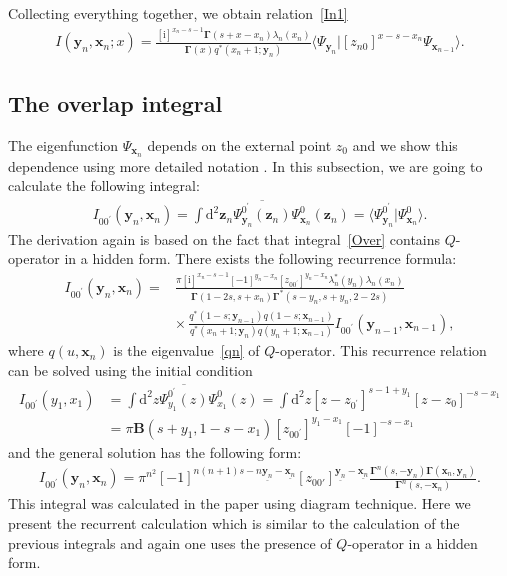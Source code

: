 \documentclass[10pt,a4paper]{amsart}
\renewcommand{\imath}{\mathrm{i}}
\numberwithin{equation}{section}
\begin{document}
Collecting everything together, we obtain relation~\eqref{In1}
\begin{align*}
I(\bm{y}_n,\bm{x}_{n};x) =
\frac{[\imath]^{x_n-s-1} \mathbf{\Gamma}(s+x-x_n) \lambda_n(x_n)}
{\mathbf{\Gamma}(x) q^*(x_n+1;\bm{y}_n)}
\langle \Psi_{\bm{y}_n}|
 [z_{n0}]^{x-s-x_n} \Psi_{\bm{x}_{n-1}}\rangle .
\end{align*}

\subsection{The overlap integral}

The eigenfunction $\Psi_{\bm{x}_{n}}$ depends on the external point
$z_0$ and we show this dependence using more detailed
notation .
In this subsection, we are going to calculate the following integral:
\begin{align}\label{Over}
I_{0 0^{\prime}}(\bm{y}_n,\bm{x}_{n}) =
\int \mathrm{d}^{2}\bm{z}_n
\overline{\Psi^{0^{\prime}}_{\bm{y}_n}(\bm{z}_n)}
\Psi^{0}_{\bm{x}_{n}}(\bm{z}_n) =
\bigl\langle\Psi^{0^{\prime}}_{\bm{y}_n} | \Psi^{0}_{\bm{x}_{n}}\bigr\rangle .
\end{align}
The derivation again is based on the fact that integral~\eqref{Over} contains $Q$-operator in a hidden form. There exists the following recurrence formula:
\begin{align}
\nonumber
I_{0 0^{\prime}}(\bm{y}_n,\bm{x}_{n}) ={}&
\frac{\pi [\imath]^{x_n-s-1} [-1]^{y_n-x_n} [z_{0 0^{\prime}}]^{y_n-x_n}\lambda_n^\ast(y_n) \lambda_n(x_n)}
{\mathbf{\Gamma}(1-2s,s+x_n) \mathbf{\Gamma}^{*}(s-y_n,s+y_n,2-2s)} \\
& \label{I0}
{\times}\, \frac{q^*(1-s;\bm{y}_{n-1}) q(1-s;\bm{x}_{n-1})}
{q^{*}(x_n+1;\bm{y}_n) q(y_n+1;\bm{x}_{n-1})}
I_{0 0^{\prime}}(\bm{y}_{n-1},\bm{x}_{n-1}) ,
\end{align}
where $q(u ,\bm x_{n})$ is the eigenvalue~\eqref{qn} of $Q$-operator.
This recurrence relation can be solved using the initial condition
\begin{align*}
I_{0 0^{\prime}}(y_1,x_{1}) & =
\int \mathrm{d}^{2} z
\overline{\Psi^{0^{\prime}}_{y_1}(z)}
\Psi^{0}_{x_{1}}(z) =
\int \mathrm{d}^{2} z
[z-z_{0^{\prime}}]^{s-1+y_1} [z-z_0]^{-s-x_1} \\
& =
\pi \mathbf{B}(s+y_1,1-s-x_1)
[z_{0 0^{\prime}}]^{y_1-x_1} [-1]^{-s-x_1}
\end{align*}
and the general solution has the following form:
\begin{align}
\label{In0}
I_{0 0^{\prime}}(\bm{y}_n,\bm{x}_{n}) = \pi^{n^2} [-1]^{n(n+1)s-n\underline{\bm{y}_n}-\underline{\bm{x}_n}}
[z_{00'}]^{\underline{\bm{y}_n}-\underline{\bm{x}_n}}
\frac{\mathbf{\Gamma}^{n}(s ,-\bm{y}_n) \mathbf{\Gamma}(\bm{x}_n,\bm{y}_n)}
{\mathbf{\Gamma}^{n}(s ,-\bm{x}_n)} .
\end{align}
This integral was calculated in the paper \cite{DMV2} using
diagram technique.
Here we present the recurrent calculation which is similar to the
calculation of the previous integrals and again one uses the presence
of $Q$-operator in a hidden form.
\end{document}

